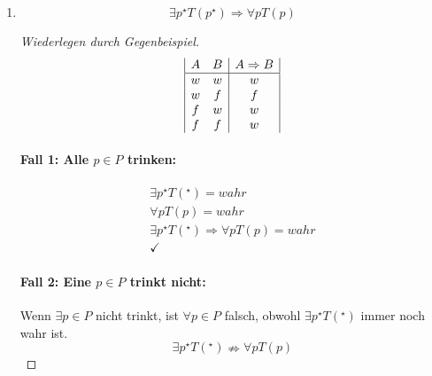 \documentclass{article}
\begin{document}
\begin{enumerate}[label=\arabic*)]
    \item \begin{equation}
              \exists p^{\star}T(p^{\star}) \Rightarrow \forall p T(p)
          \end{equation}
          \begin{proof}[Wiederlegen durch Gegenbeispiel]
              \begin{displaymath}
                  \begin{array}{|c c | c |}
                      A & B & A \Rightarrow B \\
                      \hline
                      w & w & w               \\
                      w & f & f               \\
                      f & w & w               \\
                      f & f & w               \\
                  \end{array}
              \end{displaymath}
              \paragraph{Fall 1: Alle $p \in P$ trinken:}
              \begin{gather*}
                  \exists p^{\star} T(^{\star}) = wahr \\
                  \forall p T(p) = wahr \\
                  \exists p^{\star} T(^{\star}) \Rightarrow  \forall p T(p) = wahr \\
                  \checkmark
              \end{gather*}
              \paragraph{Fall 2: Eine $p \in P$ trinkt nicht:} Wenn $\exists p \in P$ nicht trinkt, ist $\forall p \in P$ falsch, obwohl $\exists p^{\star} T(^{\star})$ immer noch wahr ist.
              \begin{equation}
                  \exists p^{\star} T(^{\star}) \nRightarrow  \forall p T(p)
              \end{equation}
          \end{proof}
\end{enumerate}
\end{document}
